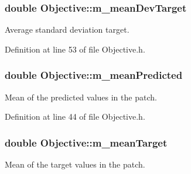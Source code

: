 \subsubsection[{\texorpdfstring{m\+\_\+mean\+Dev\+Target}{m_meanDevTarget}}]{\setlength{\rightskip}{0pt plus 5cm}double Objective\+::m\+\_\+mean\+Dev\+Target\hspace{0.3cm}{\ttfamily [private]}}\hypertarget{classObjective_ac48b9550f4153a2cb72606f1bab7f024}{}\label{classObjective_ac48b9550f4153a2cb72606f1bab7f024}


Average standard deviation target. 



Definition at line 53 of file Objective.\+h.

\subsubsection[{\texorpdfstring{m\+\_\+mean\+Predicted}{m_meanPredicted}}]{\setlength{\rightskip}{0pt plus 5cm}double Objective\+::m\+\_\+mean\+Predicted\hspace{0.3cm}{\ttfamily [private]}}\hypertarget{classObjective_a2b7cdd589578394f2c5a847a0a9aff61}{}\label{classObjective_a2b7cdd589578394f2c5a847a0a9aff61}


Mean of the predicted values in the patch. 



Definition at line 44 of file Objective.\+h.

\subsubsection[{\texorpdfstring{m\+\_\+mean\+Target}{m_meanTarget}}]{\setlength{\rightskip}{0pt plus 5cm}double Objective\+::m\+\_\+mean\+Target\hspace{0.3cm}{\ttfamily [private]}}\hypertarget{classObjective_a4d7819d119c36c2aa8aac0baf79c961a}{}\label{classObjective_a4d7819d119c36c2aa8aac0baf79c961a}


Mean of the target values in the patch. 



